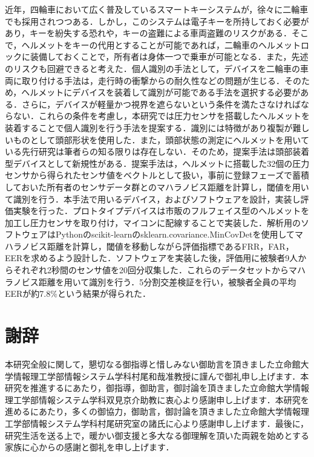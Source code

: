 \documentclass[uplatex, 12pt, papersize]{jsbook}
\begin{document}

\thesisKind{\BachelorThesis} %

\makeThesisTitle

近年，四輪車において広く普及しているスマートキーシステムが，徐々に二輪車でも採用されつつある．しかし，このシステムは電子キーを所持しておく必要があり，キーを紛失する恐れや，キーの盗難による車両盗難のリスクがある．そこで，ヘルメットをキーの代用とすることが可能であれば，二輪車のヘルメットロックに装備しておくことで，所有者は身体一つで乗車が可能となる．また，先述のリスクも回避できると考えた．個人識別の手法として，デバイスを二輪車の車両に取り付ける手法は，走行時の衝撃からの耐久性などの問題が生じる．そのため，ヘルメットにデバイスを装着して識別が可能である手法を選択する必要がある．さらに，デバイスが軽量かつ視界を遮らないという条件を満たさなければならない．これらの条件を考慮し，本研究では圧力センサを搭載したヘルメットを装着することで個人識別を行う手法を提案する．識別には特徴があり複製が難しいものとして頭部形状を使用した．また，頭部状態の測定にヘルメットを用いている先行研究は筆者らの知る限りは存在しない．そのため，提案手法は頭部装着型デバイスとして新規性がある．提案手法は，ヘルメットに搭載した32個の圧力センサから得られたセンサ値をベクトルとして扱い，事前に登録フェーズで蓄積しておいた所有者のセンサデータ群とのマハラノビス距離を計算し，閾値を用いて識別を行う．本手法で用いるデバイス，およびソフトウェアを設計，実装し評価実験を行った．プロトタイプデバイスは市販のフルフェイス型のヘルメットを加工し圧力センサを取り付け，マイコンに配線することで実装した．解析用のソフトウェアはPythonのscikit-learnのsklearn.covariance.MinCovDetを使用してマハラノビス距離を計算し，閾値を移動しながら評価指標であるFRR，FAR，EERを求めるよう設計した．ソフトウェアを実装した後，評価用に被験者9人からそれぞれ2秒間のセンサ値を20回分収集した．これらのデータセットからマハラノビス距離を用いて識別を行う．5分割交差検証を行い，被験者全員の平均EERが約7.8\%という結果が得られた．

\tableofcontents %
\listoffigures %
\listoftables %

\startMain








\chapter*{謝辞}
本研究全般に関して，懇切なる御指導と惜しみない御助言を頂きました立命館大学情報理工学部情報システム学科村尾和哉准教授に謹んで御礼申し上げます．本研究を推進するにあたり，御指導，御助言，御討論を頂きました立命館大学情報理工学部情報システム学科双見京介助教に衷心より感謝申し上げます．本研究を進めるにあたり，多くの御協力，御助言，御討論を頂きました立命館大学情報理工学部情報システム学科村尾研究室の諸氏に心より感謝申し上げます．最後に，研究生活を送る上で，暖かい御支援と多大なる御理解を頂いた両親を始めとする家族に心からの感謝と御礼を申し上げます．



\end{document}
